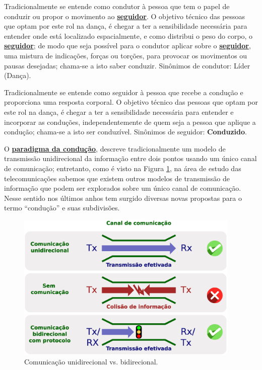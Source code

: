 \begin{definition} 
\label{def:Condutor} 
Tradicionalmente se entende como 
condutor à pessoa que tem o papel de conduzir ou propor o movimento ao 
\hyperref[def:Seguidor]{\textbf{seguidor}}. 
O objetivo técnico das pessoas que optam por este rol na dança, é chegar 
a ter a sensibilidade necessária para entender onde está localizado espacialmente, 
e como distribui o peso do corpo, o \hyperref[def:Seguidor]{\textbf{seguidor}}; 
de modo que seja possível para o condutor aplicar sobre o 
\hyperref[def:Seguidor]{\textbf{seguidor}}, 
uma mistura de indicações, forças ou torções,  
para provocar os movimentos ou pausas desejadas;
chama-se a isto saber conduzir.
Sinônimos de condutor: Líder (Dança).
\end{definition}

\begin{definition} 
\label{def:Seguidor} 
Tradicionalmente se entende como 
seguidor à pessoa que recebe a condução e proporciona uma resposta corporal. 
O objetivo técnico das pessoas que optam por este rol na dança, é chegar 
a ter a sensibilidade necessária para entender e incorporar as conduções,
independentemente de quem seja a pessoa que aplique a condução;
chama-se a isto ser conduzível.
Sinônimos de seguidor: \textbf{Conduzido}.
\end{definition}

O \hyperref[def:ParadigmaConducao]{\textbf{paradigma da condução}},
 descreve tradicionalmente 
um modelo de transmissão unidirecional da informação entre dois pontos
usando um único canal de comunicação;
entretanto, como é visto na Figura \ref{fig:tiposcomunica}, 
na área de estudo das telecomunicações 
sabemos que existem outros modelos de 
transmissão de informação que podem ser explorados 
sobre um único canal de comunicação. 
Nesse sentido 
nos últimos anhos tem surgido diversas novas propostas para o termo ``condução''
e suas subdivisões.
\begin{figure}[!ht]
     \centering
\includegraphics[width=0.95\textwidth]{chapters/cap-normas/tiposcomunica.eps}
\caption{Comunicação unidirecional vs. bidirecional.}
\label{fig:tiposcomunica}
\end{figure}


